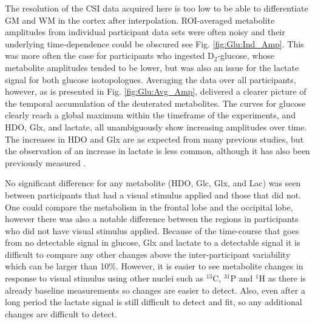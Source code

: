 
The resolution of the \ac{CSI} data acquired here is too low to be able to differentiate \ac{GM} and \ac{WM} in the cortex after interpolation. \ac{ROI}-averaged metabolite amplitudes from individual participant data sets were often noisy and their underlying time-dependence could be obscured see Fig. \ref{fig:Glu:Ind_Amp}. This was more often the case for participants who ingested D$_2$-glucose, whose metabolite amplitudes tended to be lower, but was also an issue for the lactate signal for both glucose isotopologues. Averaging the data over all participants, however, as is presented in Fig. \ref{fig:Glu:Avg_Amp}, delivered a clearer picture of the temporal accumulation of the deuterated metabolites. The curves for glucose clearly reach a global maximum within the timeframe of the experiments, and \ac{HDO}, Glx, and lactate, all unambiguously show increasing amplitudes over time. The increases in \ac{HDO} and Glx are as expected from many previous studies, but the observation of an increase in lactate is less common, although it has also been previously measured  \cite{Ruhm2021DeuteriumResolution, Kaggie2022DeuteriumMetabolism}. 


No significant difference for any metabolite (\ac{HDO}, Glc, Glx, and Lac) was seen between participants that had a visual stimulus applied and those that did not. One could compare the metabolism in the frontal lobe and the occipital lobe, however there was also a notable difference between the regions in participants who did not have visual stimulus applied. Because of the time-course that goes from no detectable signal in glucose, Glx and lactate to a detectable signal it is difficult to compare any other changes above the inter-participant variability which can be larger than 10\%. However, it is easier to see metabolite changes in response to visual stimulus using other nuclei such as $^{13}$C, $^{31}$P and $^1$H as there is already baseline measurements so changes are easier to detect. Also, even after a long period the lactate signal is still difficult to detect and fit, so any additional changes are difficult to detect.  

